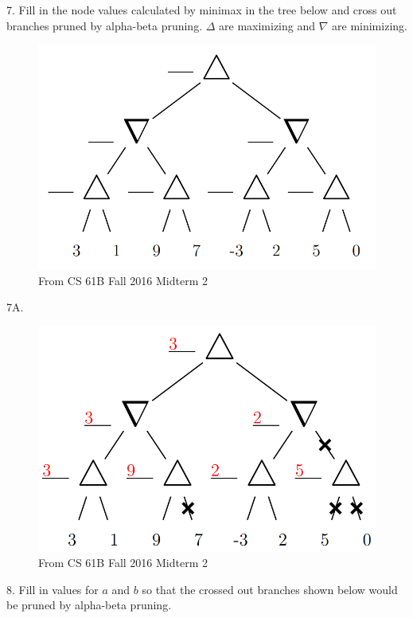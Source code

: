 \documentclass[12pt, letterpaper]{article}
\begin{document}
7. Fill in the node values calculated by minimax in the tree below and cross out branches pruned by alpha-beta pruning. $\Delta$ are maximizing and $\nabla$ are minimizing.
\begin{figure}[H]
    \centering
    \includegraphics[scale=0.3]{minimax-prob.png}
    \caption*{From CS 61B Fall 2016 Midterm 2}
\end{figure}
7A.
\begin{figure}[H]
    \centering
    \includegraphics[scale=0.3]{minimax-sol.png}
    \caption*{From CS 61B Fall 2016 Midterm 2}
\end{figure}
8. Fill in values for $a$ and $b$ so that the crossed out branches shown below would be pruned by alpha-beta pruning.
\end{document}
